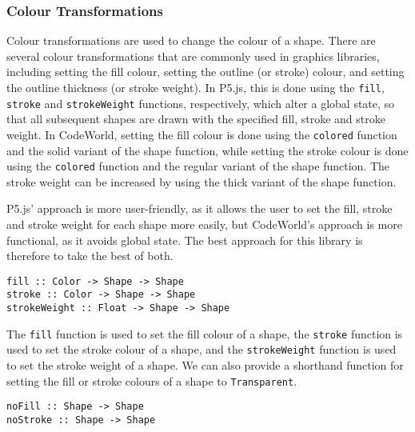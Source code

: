 \documentclass[../main.tex]{subfiles}
\begin{document}
            \subsubsection{Colour Transformations}
                Colour transformations are used to change the colour of a shape.
                There are several colour transformations that are commonly used in graphics
                    libraries, including setting the fill colour, setting the outline (or stroke)
                    colour, and setting the outline thickness (or stroke weight).
                In P5.js, this is done using the \verb|fill|, \verb|stroke| and
                    \verb|strokeWeight| functions, respectively, which alter a global state, so
                    that all subsequent shapes are drawn with the specified fill, stroke and stroke
                    weight.
                In CodeWorld, setting the fill colour is done using the \verb|colored| function
                    and the solid variant of the shape function, while setting the stroke colour is
                    done using the \verb|colored| function and the regular variant of the shape
                    function.
                The stroke weight can be increased by using the thick variant of the shape
                    function.

                P5.js' approach is more user-friendly, as it allows the user to set the fill,
                    stroke and stroke weight for each shape more easily, but CodeWorld's approach
                    is more functional, as it avoids global state.
                The best approach for this library is therefore to take the best of both.

                \begin{lstlisting}[label={lst:colour}, caption={The colour transformation functions.}]
fill :: Color -> Shape -> Shape
stroke :: Color -> Shape -> Shape
strokeWeight :: Float -> Shape -> Shape\end{lstlisting}

                The \verb|fill| function is used to set the fill colour of a shape, the
                    \verb|stroke| function is used to set the stroke colour of a shape, and the
                    \verb|strokeWeight| function is used to set the stroke weight of a shape.
                We can also provide a shorthand function for setting the fill or stroke colours
                    of a shape to \verb|Transparent|.

                \begin{lstlisting}[label={lst:shorthandColour}, caption={The shorthand colour transformation functions.}]
noFill :: Shape -> Shape
noStroke :: Shape -> Shape\end{lstlisting}
\end{document}
